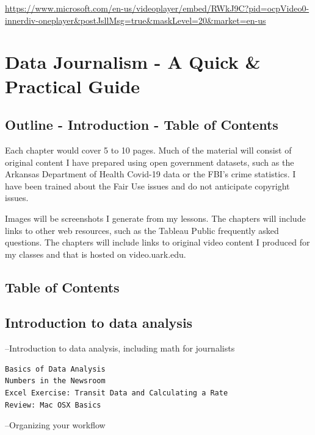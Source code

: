 \documentclass[]{book}
\begin{document}
\url{https://www.microsoft.com/en-us/videoplayer/embed/RWkJ9C?pid=ocpVideo0-innerdiv-oneplayer\&postJsllMsg=true\&maskLevel=20\&market=en-us}

\hypertarget{data-journalism---a-quick-practical-guide-1}{%
\chapter{Data Journalism - A Quick \& Practical Guide}\label{data-journalism---a-quick-practical-guide-1}}

\hypertarget{Introduction_TOC}{%
\section{Outline - Introduction - Table of Contents}\label{Introduction_TOC}}

Each chapter would cover 5 to 10 pages. Much of the material will consist of original content I have prepared using open government datasets, such as the Arkansas Department of Health Covid-19 data or the FBI's crime statistics. I have been trained about the Fair Use issues and do not anticipate copyright issues.

Images will be screenshots I generate from my lessons. The chapters will include links to other web resources, such as the Tableau Public frequently asked questions. The chapters will include links to original video content I produced for my classes and that is hosted on video.uark.edu.

\hypertarget{table-of-contents}{%
\section{Table of Contents}\label{table-of-contents}}

\hypertarget{introduction-to-data-analysis}{%
\section{Introduction to data analysis}\label{introduction-to-data-analysis}}

--Introduction to data analysis, including math for journalists

\begin{verbatim}
Basics of Data Analysis
Numbers in the Newsroom
Excel Exercise: Transit Data and Calculating a Rate
Review: Mac OSX Basics
\end{verbatim}

--Organizing your workflow
\end{document}
